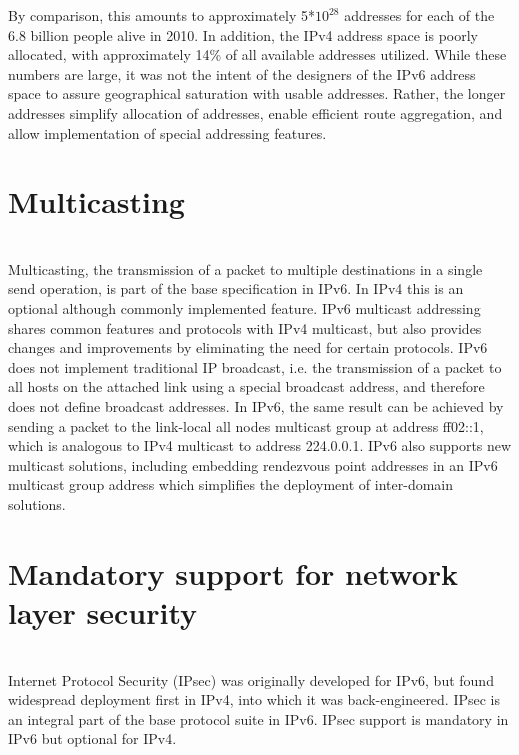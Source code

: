 \documentclass[12pt]{article}
\begin{document}
By comparison, this amounts to approximately 5*$10^{28}$ addresses for each of the 6.8 billion people alive in 2010. In addition, the IPv4 address space is poorly allocated, with approximately 14\% of all available addresses utilized. While these numbers are large, it was not the intent of the designers of the IPv6 address space to assure geographical saturation with usable addresses. Rather, the longer addresses simplify allocation of addresses, enable efficient route aggregation, and allow implementation of special addressing features.\\
\section{Multicasting}\\
Multicasting, the transmission of a packet to multiple destinations in a single send operation, is part of the base specification in IPv6. In IPv4 this is an optional although commonly implemented feature. IPv6 multicast addressing shares common features and protocols with IPv4 multicast, but also provides changes and improvements by eliminating the need for certain protocols. IPv6 does not implement traditional IP broadcast, i.e. the transmission of a packet to all hosts on the attached link using a special broadcast address, and therefore does not define broadcast addresses. In IPv6, the same result can be achieved by sending a packet to the link-local all nodes multicast group at address ff02::1, which is analogous to IPv4 multicast to address 224.0.0.1. IPv6 also supports new multicast solutions, including embedding rendezvous point addresses in an IPv6 multicast group address which simplifies the deployment of inter-domain solutions.\\
\section{Mandatory support for network layer security}\\
Internet Protocol Security (IPsec) was originally developed for IPv6, but found widespread deployment first in IPv4, into which it was back-engineered. IPsec is an integral part of the base protocol suite in IPv6. IPsec support is mandatory in IPv6 but optional for IPv4.
\end{document}

